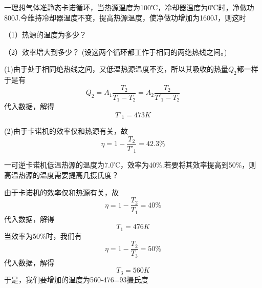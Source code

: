 \documentclass[lang=cn,10pt]{elegantbook}
\begin{document}
	\begin{example}
		一理想气体准静态卡诺循环，当热源温度为100℃，冷却器温度为0℃时，净做功800J.今维持冷却器温度不变，提高热源温度，使净做功增加为1600J，则这时
		
		（1）热源的温度为多少？
		
		（2）效率增大到多少？
		(设这两个循环都工作于相同的两绝热线之间。)
	\end{example}
	\begin{solution}
		
		(1)由于处于相同绝热线之间，又低温热源温度不变，所以其吸收的热量$Q_{2}$都一样
		于是有
		\begin{equation*}
			Q_{2}=A_{1}\frac{T_{2}}{T_{1}-T_{2}}=A_{2}\frac{T_{2}}{T'_{1}-T_{2}}
		\end{equation*}
		代入数据，解得
		\begin{equation*}
			T'_{1}=473K
		\end{equation*}
		
		(2)由于卡诺机的效率仅和热源有关，故
		\begin{equation*}
			\eta=1-\frac{T_{2}}{T'_{1}}=42.3 \%
		\end{equation*}
	\end{solution}
	\begin{example}
		一可逆卡诺机低温热源的温度为7.0℃，效率为40$\%$.若要将其效率提高到50$\%$，则高温热源的温度需要提高几摄氏度？
	\end{example}
	\begin{solution}
	由于卡诺机的效率仅和热源有关，故
	\begin{equation*}
			\eta=1-\frac{T_{2}}{T_{1}}=40 \%
	\end{equation*}	
	代入数据，解得
	\begin{equation*}
		T_{1}=476K
	\end{equation*}
	当效率为50$\%$时，我们有
		\begin{equation*}
		\eta=1-\frac{T_{2}}{T_{3}}=50 \%
	\end{equation*}	
	代入数据，解得
	\begin{equation*}
		T_{3}=560K
	\end{equation*}
	于是，我们要增加的温度为560-476=93摄氏度
	\end{solution}
\end{document}
